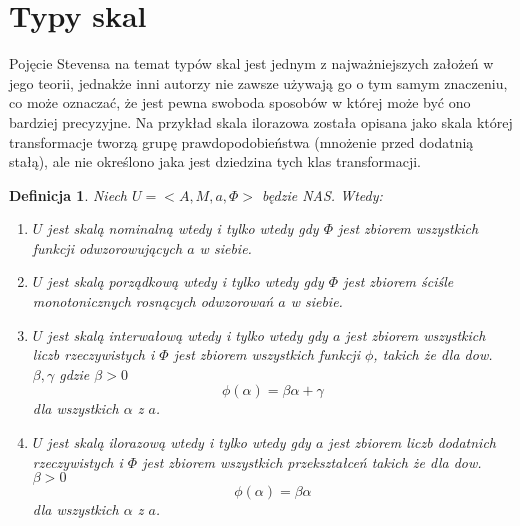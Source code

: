 \documentclass[12pt,a4paper]{report}
\newtheorem{definition}{Definicja}
\begin{document}
\section{Typy skal}
Pojęcie Stevensa na temat typów skal jest jednym z najważniejszych założeń w jego teorii, jednakże inni autorzy nie zawsze używają go o tym samym znaczeniu, co może oznaczać, że jest pewna swoboda sposobów w której może być ono bardziej precyzyjne. Na przykład skala ilorazowa została opisana jako skala której transformacje tworzą grupę prawdopodobieństwa (mnożenie przed dodatnią stałą), ale nie określono jaka jest dziedzina tych klas transformacji.  
\begin{definition}
Niech $U=<A, M, a, \Phi>$ będzie NAS. Wtedy:
\begin{enumerate}
\item
$U$ jest skalą nominalną wtedy i tylko wtedy gdy $\Phi$ jest zbiorem wszystkich funkcji odwzorowujących $a$ w siebie.
\item
$U$ jest skalą porządkową wtedy i tylko wtedy gdy $\Phi$ jest zbiorem ściśle monotonicznych rosnących odwzorowań $a$ w siebie.
\item
$U$ jest skalą interwałową wtedy i tylko wtedy gdy $a$ jest zbiorem wszystkich liczb rzeczywistych i $\Phi$ jest zbiorem wszystkich funkcji $\phi$, takich że dla dow. $\beta,\gamma$ gdzie $\beta>0$
\begin{equation*}
\phi(\alpha)=\beta\alpha+\gamma
\end{equation*}
dla wszystkich $\alpha$ z $a$.
\item
$U$ jest skalą ilorazową wtedy i tylko wtedy gdy $a$ jest zbiorem liczb dodatnich rzeczywistych i $\Phi$ jest zbiorem wszystkich przekształceń takich że dla dow. $\beta>0$
\begin{equation*}
\phi(\alpha)=\beta\alpha
\end{equation*}
dla wszystkich $\alpha$ z $a$.
\end{enumerate}
\end{definition}

\end{document}
